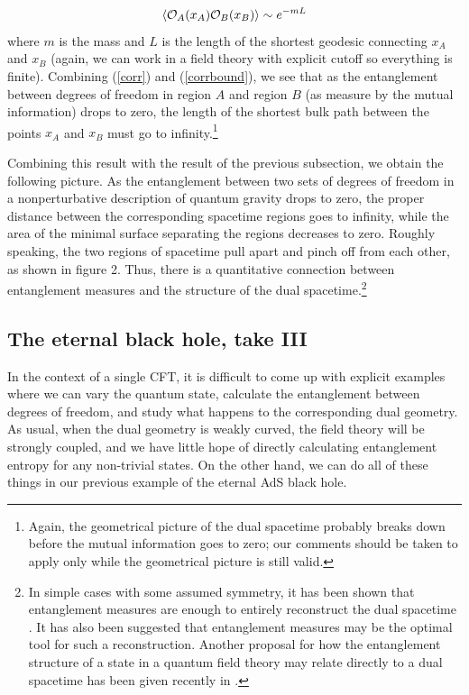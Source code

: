 \documentclass[12pt,epsf]{article}
\newcommand{\be}{\begin{equation}}
\newcommand{\ee}{\end{equation}}
\renewcommand{\(}{\left(}
\renewcommand{\)}{\right)}
\begin{document}
\be
\label{corr}
\langle {\cal O}_A(x_A) {\cal O}_B (x_B) \rangle \sim e^{-m L}
\ee
where $m$ is the mass and $L$ is the length of the shortest geodesic connecting $x_A$ and $x_B$ (again, we can work in a field theory with explicit cutoff so everything is finite). Combining (\ref{corr}) and (\ref{corrbound}), we see that as the entanglement between degrees of freedom in region $A$ and region $B$  (as measure by the mutual information) drops to zero, the length of the shortest bulk path between the points $x_A$ and $x_B$ must go to infinity.\footnote{Again, the geometrical picture of the dual spacetime probably breaks down before the mutual information goes to zero; our comments should be taken to apply only while the geometrical picture is still valid.}

Combining this result with the result of the previous subsection, we obtain the following picture. As the entanglement between two sets of degrees of freedom in a nonperturbative description of quantum gravity drops to zero, the proper distance between the corresponding spacetime regions goes to infinity, while the area of the minimal surface separating the regions decreases to zero. Roughly speaking, the two regions of spacetime pull apart and pinch off from each other, as shown in figure 2. Thus, there is a quantitative connection between entanglement measures and the structure of the dual spacetime.\footnote{In simple cases with some assumed symmetry, it has been shown that entanglement measures are enough to entirely reconstruct the dual spacetime \cite{hammersley,bilson}. It has also been suggested \cite{hubeny} that entanglement measures may be the optimal tool for such a reconstruction. Another proposal for how the entanglement structure of a state in a quantum field theory may relate directly to a dual spacetime has been given recently in \cite{swingle}.}

\subsection{The eternal black hole, take III}

In the context of a single CFT, it is difficult to come up with explicit examples where we can vary the quantum state, calculate the entanglement between degrees of freedom, and study what happens to the corresponding dual geometry. As usual, when the dual geometry is weakly curved, the field theory will be strongly coupled, and we have little hope of directly calculating entanglement entropy for any non-trivial states. On the other hand, we can do all of these things in our previous example of the eternal AdS black hole.
\end{document}
